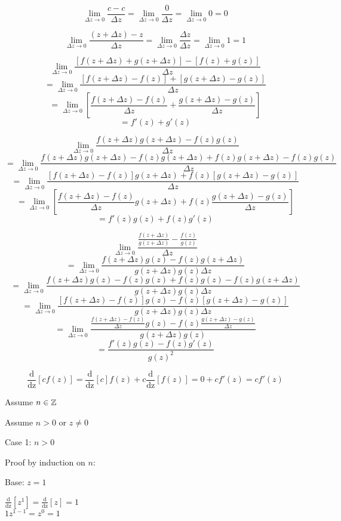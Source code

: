 \documentclass[letterpaper,12pt,fleqn]{article}
\newcommand{\dz}[1]{\operatorname{\frac{d}{dz}}\left[#1\right]}
\newcommand{\D}{\Delta}
\newcommand{\Dz}{\D z}
\newcommand{\limdz}{\lim_{\D z\to0}}
\begin{document}
\begin{theproof}
  \listbreak
  \begin{enumerate}
  \item
    \[\limdz{\frac{c-c}{\Dz}}=\limdz\frac{0}{\Dz}=\limdz0=0\]

  \item
    \[\limdz{\frac{(z+\Dz)-z}{\Dz}}=\limdz\frac{\Dz}{\Dz}=\limdz1=1\]

  \item
    \[\limdz{\frac{[f(z+\Dz)+g(z+\Dz)]-[f(z)+g(z)]}{\Dz}}\]
    \[=\limdz{\frac{[f(z+\Dz)-f(z)]+[g(z+\Dz)-g(z)]}{\Dz}}\]
    \[=\limdz{\left[\frac{f(z+\Dz)-f(z)}{\Dz}+\frac{g(z+\Dz)-g(z)}{\Dz}
        \right]}\]
    \[=f'(z)+g'(z)\]

  \item
    \[\limdz{\frac{f(z+\Dz)g(z+\Dz)-f(z)g(z)}{\Dz}}\]
    \[=\limdz{\frac{f(z+\Dz)g(z+\Dz)-f(z)g(z+\Dz)+f(z)g(z+\Dz)-
        f(z)g(z)}{\Dz}}\]
    \[=\limdz{\frac{[f(z+\Dz)-f(z)]g(z+\Dz)+f(z)[g(z+\Dz)-g(z)]}{\Dz}}\]
    \[=\limdz{\left[\frac{f(z+\Dz)-f(z)}{\Dz}g(z+\Dz)+
        f(z)\frac{g(z+\Dz)-g(z)}{\Dz}\right]}\]
    \[=f'(z)g(z)+f(z)g'(z)\]

  \item
    \[\limdz{\frac{\frac{f(z+\Dz)}{g(z+\Dz)}-\frac{f(z)}{g(z)}}{\Dz}}\]
    \[=\limdz{\frac{f(z+\Dz)g(z)-f(z)g(z+\Dz)}{g(z+\Dz)g(z)\Dz}}\]
    \[=\limdz{\frac{f(z+\Dz)g(z)-f(z)g(z)+f(z)g(z)-f(z)g(z+\Dz)}
      {g(z+\Dz)g(z)\Dz}}\]
    \[=\limdz{\frac{[f(z+\Dz)-f(z)]g(z)-f(z)[g(z+\Dz)-g(z)]}{g(z+\Dz)g(z)\Dz}}\]
    \[=\limdz{\frac{\frac{f(z+\Dz)-f(z)}{\Dz}g(z)-
        f(z)\frac{g(z+\Dz)-g(z)}{\Dz}}{g(z+\Dz)g(z)}}\]
    \[=\frac{f'(z)g(z)-f(z)g'(z)}{g(z)^2}\]

  \item
    \[\dz{cf(z)}=\dz{c}f(z)+c\dz{f(z)}=0+cf'(z)=cf'(z)\]

  \item Assume $n\in\mathbb{Z}$

    Assume $n>0$ or $z\ne0$

    \begin{description}
    \item Case 1: $n>0$

      Proof by induction on $n$:

      \begin{description}
      \item Base: $z=1$

        $\dz{z^1}=\dz{z}=1$ \\
        $1z^{1-1}=z^0=1$


\end{description}
\end{description}
\end{enumerate}
\end{theproof}
\end{document}
